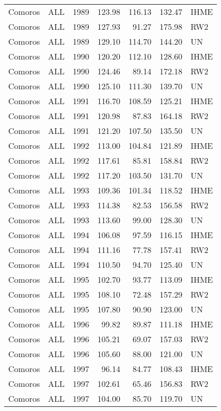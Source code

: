 \begin{longtable}{lllrrrl}
  Comoros & ALL & 1989 & 123.98 & 116.13 & 132.47 & IHME \\ 
  Comoros & ALL & 1989 & 127.93 & 91.27 & 175.98 & RW2 \\ 
  Comoros & ALL & 1989 & 129.10 & 114.70 & 144.20 & UN \\ 
  Comoros & ALL & 1990 & 120.20 & 112.10 & 128.60 & IHME \\ 
  Comoros & ALL & 1990 & 124.46 & 89.14 & 172.18 & RW2 \\ 
  Comoros & ALL & 1990 & 125.10 & 111.30 & 139.70 & UN \\ 
  Comoros & ALL & 1991 & 116.70 & 108.59 & 125.21 & IHME \\ 
  Comoros & ALL & 1991 & 120.98 & 87.83 & 164.18 & RW2 \\ 
  Comoros & ALL & 1991 & 121.20 & 107.50 & 135.50 & UN \\ 
  Comoros & ALL & 1992 & 113.00 & 104.84 & 121.89 & IHME \\ 
  Comoros & ALL & 1992 & 117.61 & 85.81 & 158.84 & RW2 \\ 
  Comoros & ALL & 1992 & 117.20 & 103.50 & 131.70 & UN \\ 
  Comoros & ALL & 1993 & 109.36 & 101.34 & 118.52 & IHME \\ 
  Comoros & ALL & 1993 & 114.38 & 82.53 & 156.58 & RW2 \\ 
  Comoros & ALL & 1993 & 113.60 & 99.00 & 128.30 & UN \\ 
  Comoros & ALL & 1994 & 106.08 & 97.59 & 116.15 & IHME \\ 
  Comoros & ALL & 1994 & 111.16 & 77.78 & 157.41 & RW2 \\ 
  Comoros & ALL & 1994 & 110.50 & 94.70 & 125.40 & UN \\ 
  Comoros & ALL & 1995 & 102.70 & 93.77 & 113.09 & IHME \\ 
  Comoros & ALL & 1995 & 108.10 & 72.48 & 157.29 & RW2 \\ 
  Comoros & ALL & 1995 & 107.80 & 90.90 & 123.00 & UN \\ 
  Comoros & ALL & 1996 & 99.82 & 89.87 & 111.18 & IHME \\ 
  Comoros & ALL & 1996 & 105.21 & 69.07 & 157.03 & RW2 \\ 
  Comoros & ALL & 1996 & 105.60 & 88.00 & 121.00 & UN \\ 
  Comoros & ALL & 1997 & 96.14 & 84.77 & 108.43 & IHME \\ 
  Comoros & ALL & 1997 & 102.61 & 65.46 & 156.83 & RW2 \\ 
  Comoros & ALL & 1997 & 104.00 & 85.70 & 119.70 & UN \\ 

\end{longtable}
